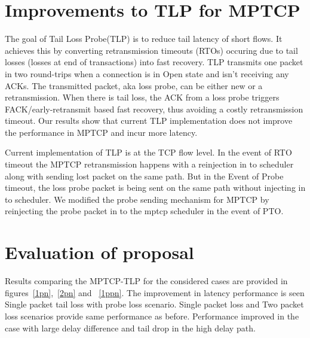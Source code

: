 \documentclass[10pt,draftcls,twocolumn]{IEEEconf}
\begin{document}


\section{Improvements to TLP for MPTCP}
The goal of Tail Loss Probe(TLP) is to reduce tail latency of short flows. It achieves this by converting retransmission timeouts (RTOs) occuring due to tail losses (losses at end of transactions) into fast recovery. TLP transmits one packet in two round-trips when a connection is in Open state and isn't receiving any ACKs. The transmitted packet, aka loss probe, can be either new or a retransmission. When there is tail loss, the ACK from a loss probe triggers FACK/early-retransmit based fast recovery, thus avoiding a costly retransmission timeout. Our results show that current TLP implementation does not improve the performance in MPTCP and incur more latency.

Current implementation of TLP is at the TCP flow level. In the event of RTO timeout the MPTCP retransmission happens with a reinjection in to scheduler along with sending lost packet on the same path. But in the Event of Probe timeout, the loss probe packet is being sent on the same path without injecting in to scheduler.  
We modified the probe sending mechanism for MPTCP by reinjecting the probe packet in to the mptcp scheduler in the event of PTO.



\section{Evaluation of proposal}


Results comparing the MPTCP-TLP for the considered cases are provided in figures~\ref{1pn},~\ref{2pn} and ~\ref{1ppn}. The improvement in latency
performance is seen Single packet tail loss with probe loss scenario. Single packet loss and Two packet loss scenarios provide same performance as 
before. Performance improved in the case with large delay difference and tail drop in the high delay path. 
\end{document}
